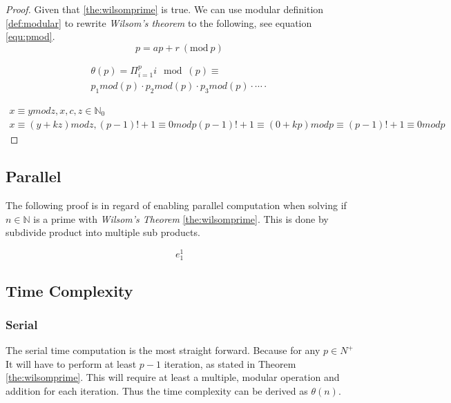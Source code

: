 \documentclass[12pt, oneside, onecolumn]{article}
\newcommand{\Mod}[1]{\ (\mathrm{mod}\ #1)}
\begin{document}
\begin{proof}
Given that \ref{the:wilsomprime} is true. We can use modular definition \ref{def:modular} to rewrite \emph{Wilsom's theorem} to the following, see equation \ref{equ:pmod}.
%
\begin{equation}\label{equ:pmod}
p = ap + r \Mod{p}
\end{equation}

%
\begin{equation}\label{equ:}
\begin{split}
\theta(p) = \Pi_{i = 1}^{p} i\mod(p)	\!
\equiv									\\
p_1mod(p)\cdot p_2mod(p) \cdot p_3mod(p) \cdot\cdots\cdot
\end{split}
\end{equation}

%
\begin{equation}
\begin{split}
x\equiv ymodz, x,c,z \in \mathbb{N}_{0} \\
x\equiv (y + kz)mod z,						
(p -1)!+1\equiv0modp
(p-1)!+1\equiv(0+kp)modp
\equiv (p-1)!+1\equiv 0 mod p
\end{split}
\end{equation}

\end{proof}

% 
\subsection{Parallel}
The following proof is in regard of enabling parallel computation when solving if $n \in \mathbb{N}$ is a prime with \emph{Wilsom's Theorem} \ref{the:wilsomprime}. This is done by subdivide product into multiple sub products.

\begin{equation}
e_{1}^{1}
\end{equation}

%
\subsection{Time Complexity}
\subsubsection{Serial}\label{sec:time:serial}
The serial time computation is the most straight forward. Because for any $p \in{N}^+$ It will have to perform at least $p - 1$ iteration, as stated in Theorem \ref{the:wilsomprime}. This will require at least a multiple, modular operation and addition for each iteration. Thus the time complexity can be derived as $\theta(n)$.
\end{document}
